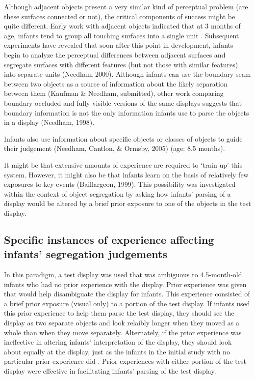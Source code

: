 Although adjacent objects present a very similar kind of perceptual
problem (are these surfaces connected or not), the critical components
of success might be quite different.  Early work with adjacent objects
indicated that at 3 months of age, infants tend to group all touching
surfaces into a single unit \cite{kestenbaum87perception}.
Subsequent experiments have revealed that soon after this point in
development, infants begin to analyze the perceptual differences
between adjacent surfaces and segregate surfaces with different
features (but not those with similar features) into separate units
(Needham 2000).  Although infants can use the boundary seam between
two objects as a source of information about the likely separation
between them (Kaufman \& Needham, submitted), other work comparing
boundary-occluded and fully visible versions of the same displays
suggests that boundary information is not the only information infants
use to parse the objects in a display (Needham, 1998).  

Infants also use information about specific objects or
classes of objects to guide their judgement (Needham, Cantlon, \& Ormsby, 2005) (age: 8.5 months).


It might be that extensive amounts of experience are required to
`train up' this system.  However, it might also be that infants learn
on the basis of relatively few exposures to key events (Baillargeon,
1999).  This possibility was investigated within the context of object
segregation by asking how infants' parsing of a display would be
altered by a brief prior exposure to one of the objects in the test
display.



\subsection{Specific instances of experience affecting infants' segregation judgements}

In this paradigm, a test display was used that was ambiguous to
4.5-month-old infants who had no prior experience with the display.
Prior experience was given that would help disambiguate the display
for infants.  This experience consisted of a brief prior exposure
(visual only) to a portion of the test display.  If infants used this
prior experience to help them parse the test display, they should see
the display as two separate objects and look relaibly longer when they
moved as a whole than when they move separately.  Alternately, if the
prior experience was ineffective in altering infants'
interpretation of the display, they should look about equally at the
display, just as the infants in the initial study with no particular
prior experience did \cite{needham98effects}.  Prior experiences
with either portion of the test display were effective in facilitating
infants' parsing of the test display.  

